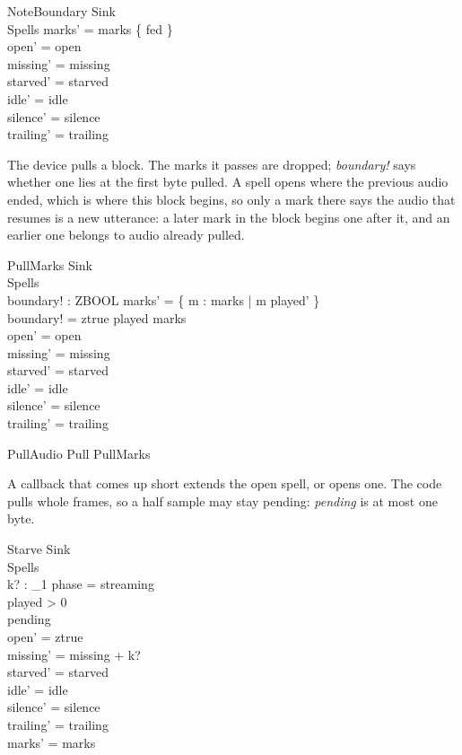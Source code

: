 \documentclass[a4paper,10pt,fleqn]{article}
\begin{document}
\begin{schema}{NoteBoundary}
  \Xi Sink \\
  \Delta Spells
\where
  marks' = marks \cup \{ fed \} \\
  open' = open \\
  missing' = missing \\
  starved' = starved \\
  idle' = idle \\
  silence' = silence \\
  trailing' = trailing
\end{schema}

The device pulls a block. The marks it passes are dropped; \emph{boundary!}
says whether one lies at the first byte pulled. A spell opens where the
previous audio ended, which is where this block begins, so only a mark there
says the audio that resumes is a new utterance: a later mark in the block
begins one after it, and an earlier one belongs to audio already pulled.

\begin{schema}{PullMarks}
  \Delta Sink \\
  \Delta Spells \\
  boundary! : ZBOOL
\where
  marks' = \{ m : marks | m \geq played' \} \\
  boundary! = ztrue \iff played \in marks \\
  open' = open \\
  missing' = missing \\
  starved' = starved \\
  idle' = idle \\
  silence' = silence \\
  trailing' = trailing
\end{schema}

\begin{zed}
  PullAudio  Pull \land PullMarks
\end{zed}

A callback that comes up short extends the open spell, or opens one. The
code pulls whole frames, so a half sample may stay pending: \emph{pending}
is at most one byte.

\begin{schema}{Starve}
  \Xi Sink \\
  \Delta Spells \\
  k? : \nat_1
\where
  phase = streaming \\
  played > 0 \\
  pending  \\
  open' = ztrue \\
  missing' = missing + k? \\
  starved' = starved \\
  idle' = idle \\
  silence' = silence \\
  trailing' = trailing \\
  marks' = marks
\end{schema}
\end{document}
